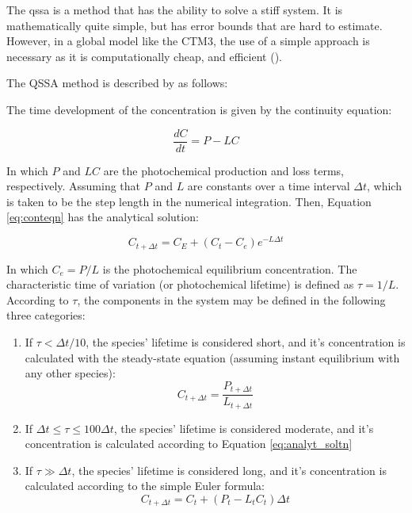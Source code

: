 The \acrshort{qssa} is a method that has the ability to solve a stiff system. It is mathematically quite simple, but has error bounds that are hard to estimate. However, in a global model like the CTM3, the use of a simple approach is necessary as it is computationally cheap, and efficient (\cite{Hesstvedt1978}). 

\medskip

The QSSA method is described by \cite{Hesstvedt1978} as follows: 

\medskip

The time development of the concentration is given by the continuity equation:

\begin{equation}
    \frac{dC}{dt} = P - LC
    \label{eq:conteqn}
\end{equation}

In which $P$ and $LC$ are the photochemical production and loss terms, respectively. Assuming that $P$ and $L$ are constants over a time interval $\Delta t$, which is taken to be the step length in the numerical integration. Then, Equation \ref{eq:conteqn} has the analytical solution: 

\begin{equation}
    C_{t + \Delta t} = C_{E} + (C_{t} - C_{e})e^{-L\Delta t}
    \label{eq:analyt_soltn}
\end{equation}

In which $C_{e} = P/L$ is the photochemical equilibrium concentration. The characteristic time of variation (or photochemical lifetime) is defined as $\tau = 1/L$. According to $\tau$, the components in the system may be defined in the following three categories: 

\begin{enumerate}[label=(\roman*)]
    \item If $\tau < \Delta t/10$, the species' lifetime is considered short, and it's concentration is calculated with the steady-state equation (assuming instant equilibrium with any other species):
    \begin{equation}
        C_{t + \Delta t} = \frac{P_{t + \Delta t}}{L_{t + \Delta t}}
        \label{eq:a}
    \end{equation}
    \item If $\Delta t \leq \tau \leq 100\Delta t$, the species' lifetime is considered moderate, and it's concentration is calculated according to Equation \ref{eq:analyt_soltn}
    \item If $\tau \gg \Delta t$, the species' lifetime is considered long, and it's concentration is calculated according to the simple Euler formula: 
    \begin{equation}
        C_{t + \Delta t} = C_t + (P_t - L_tC_t)\Delta t
        \label{eq:b}
    \end{equation}
\end{enumerate}

